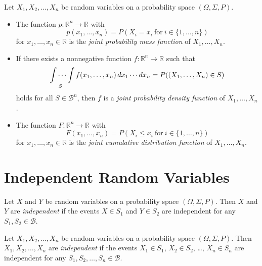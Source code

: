 \begin{definition}
  Let $X_1, X_2, \dots, X_n$ be random variables on a probability space
  $(\Omega, \Sigma, P)$.
  \begin{itemize}
    \item The function $p: \mathbb{R}^n \to \mathbb{R}$ with
      \begin{equation*}
        p(x_1, \dots, x_n)
        = P(X_i = x_i\ \text{for}\ i \in \{1, \dots, n\})
      \end{equation*}
      for $x_1, \dots, x_n \in \mathbb{R}$ is the
      \emph{joint probability mass function} of $X_1, \dots, X_n$.
    \item If there exists a nonnegative function
      $f: \mathbb{R}^n \to \mathbb{R}$ such that
      \begin{equation*}
        \idotsint\limits_S f(x_1, \dots, x_n)\,dx_1 \cdots dx_n
        = P((X_1, \dots, X_n) \in S)
      \end{equation*}
      holds for all $S \in \mathcal{B}^n$, then $f$ is a
      \emph{joint probability density function} of $X_1, \dots, X_n$.
    \item The function $F: \mathbb{R}^n \to \mathbb{R}$ with
      \begin{equation*}
        F(x_1, \dots, x_n)
        = P(X_i \leq x_i\ \text{for}\ i \in \{1, \dots, n\})
      \end{equation*}
      for $x_1, \dots, x_n \in \mathbb{R}$ is the
      \emph{joint cumulative distribution function} of $X_1, \dots, X_n$.
  \end{itemize}
\end{definition}

\section{Independent Random Variables}
\begin{definition}
  Let $X$ and $Y$ be random variables on a probability space
  $(\Omega, \Sigma, P)$.
  Then $X$ and $Y$ are \emph{independent} if the events $X \in S_1$ and
  $Y \in S_2$ are independent for any $S_1, S_2 \in \mathcal{B}$.
\end{definition}

\begin{definition}
  Let $X_1, X_2, \dots, X_n$ be random variables on a probability space
  $(\Omega, \Sigma, P)$.
  Then $X_1, X_2, \dots, X_n$ are \emph{independent} if the events
  $X_1 \in S_1$, $X_2 \in S_2$, \dots, $X_n \in S_n$ are independent
  for any $S_1, S_2, \dots, S_n \in \mathcal{B}$.
\end{definition}

